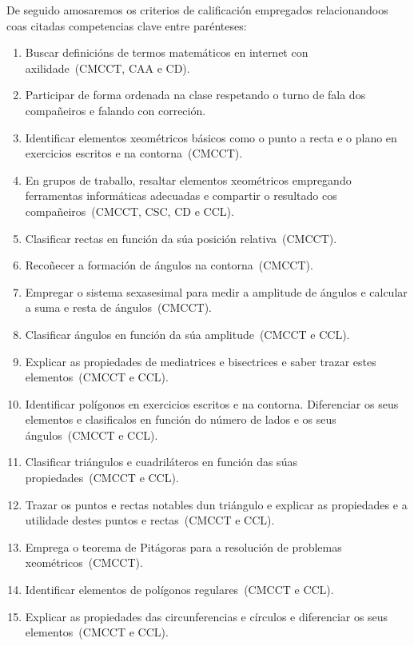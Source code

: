 De seguido amosaremos os criterios de calificación empregados relacionandoos coas citadas competencias clave entre parénteses:

\begin{enumerate}[label=\bfseries Cri\arabic*, align=left, leftmargin=1.5cm]
  \item\label{cri:definicions} Buscar definicións de termos matemáticos en internet con axilidade~(CMCCT, CAA e CD).
  \item\label{cri:interviraula} Participar de forma ordenada na clase respetando o turno de fala dos compañeiros e falando con correción.
  \item\label{cri:puntorecta} Identificar elementos xeométricos básicos como o punto a recta e o plano en exercicios escritos e na contorna~(CMCCT).
  \item\label{cri:resaltar} En grupos de traballo, resaltar elementos xeométricos empregando ferramentas informáticas adecuadas e compartir o resultado cos compañeiros~(CMCCT, CSC, CD e CCL).
  \item\label{cri:posrectas} Clasificar rectas en función da súa posición relativa~(CMCCT).
  \item\label{cri:angulos} Recoñecer a formación de ángulos na contorna~(CMCCT).
  \item\label{cri:sexasesimal} Empregar o sistema sexasesimal para medir a amplitude de ángulos e calcular a suma e resta de ángulos~(CMCCT).
  \item\label{cri:clasangulos} Clasificar ángulos en función da súa amplitude~(CMCCT e CCL).
  \item\label{cri:mediatriz} Explicar as propiedades de mediatrices e bisectrices e saber trazar estes elementos~(CMCCT e CCL).
  \item\label{cri:poligonos} Identificar polígonos en exercicios escritos e na contorna. Diferenciar os seus elementos e clasificalos en función do número de lados e os seus ángulos~(CMCCT e CCL).
  \item\label{cri:claspoligonos} Clasificar triángulos e cuadriláteros en función das súas propiedades~(CMCCT e CCL).
  \item\label{cri:puntosnotables} Trazar os puntos e rectas notables dun triángulo e explicar as propiedades e a utilidade destes puntos e rectas~(CMCCT e CCL).
  \item\label{cri:pitagoras} Emprega o teorema de Pitágoras para a resolución de problemas xeométricos~(CMCCT).
  \item\label{cri:elementosregulares} Identificar elementos de polígonos regulares~(CMCCT e CCL).
  \item\label{cri:circunferencia} Explicar as propiedades das circunferencias e círculos e diferenciar os seus elementos~(CMCCT e CCL).
\end{enumerate}

